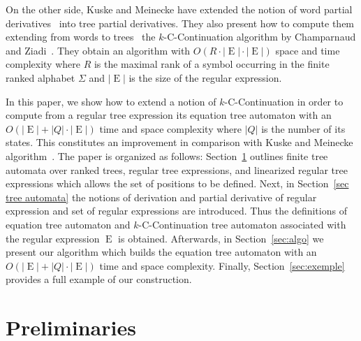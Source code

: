 \documentclass{llncs}
\DeclareMathOperator{\E}{E}
\begin{document}
 On the other side, Kuske and Meinecke have extended the notion of  word partial derivatives~\cite{antimirov} into  tree partial derivatives. They also present how to compute them extending  from words to trees~\cite{automate2} the $k$-C-Continuation algorithm by Champarnaud and Ziadi~\cite{ZPC1}. They obtain an algorithm with $O(R\cdot|\E|\cdot|\E|)$ space and time complexity where $R$ is the maximal rank of a symbol  occurring  in the finite ranked alphabet $\Sigma$ and $|\E|$ is the size of the regular expression.

In this paper, we show how to extend a notion of $k$-C-Continuation in order to compute from a regular tree expression its equation tree automaton  with an $O(|\E|+|Q|\cdot|\E|)$ time and space complexity where $|Q|$ is the number of its states. This constitutes an improvement in comparison with  Kuske and Meinecke algorithm~\cite{automate2}. The paper is organized as follows: Section~\ref{sec prelim} outlines finite tree automata over ranked trees, regular tree expressions, and linearized regular tree expressions which allows the set of positions to be defined. Next, in Section~\ref{sec tree automata} the notions of derivation and partial derivative of regular expression and set of regular expressions are 
introduced. Thus the definitions of equation tree automaton and $k$-C-Continuation tree automaton associated with the regular expression $\E$ is obtained. Afterwards, in Section~\ref{sec:algo} we present our algorithm which builds the equation tree automaton with an $O(|\E|+|Q|\cdot|\E|)$ time and space complexity. Finally, Section~\ref{sec:exemple} provides a full example of our construction.

\section{Preliminaries}\label{sec prelim}
\end{document}
